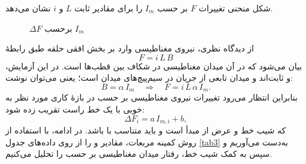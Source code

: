 \documentclass[a4paper, 11pt]{article}
\begin{document}
شکل منحنی تغییرات $F$ بر حسب $I_m$ را برای مقادیر ثابت $L$ و $i$ نشان می‌دهد.

\begin{figure}[h]
\caption{{$\Delta F$ برحسب $I_m$}}
\label{fig:ImF}
\centering
{}

\end{figure}

از دیدگاه نظری، نیروی مغناطیسی وارد بر بخش افقی حلقه طبق رابطهٔ
\begin{equation}
F = i\,L\,B
\end{equation}
بیان می‌شود که در آن  میدان مغناطیسی در شکاف بین قطب‌ها است. در این آزمایش،  و  ثابت‌اند و میدان  تابعی از جریان  در سیم‌پیچ‌های میدان است؛ یعنی می‌توان نوشت:
\begin{equation}
B = \alpha\,I_m \quad\Rightarrow\quad F = i\,L\,\alpha\,I_m.
\end{equation}
بنابراین انتظار می‌رود تغییرات نیروی مغناطیسی بر حسب  در بازهٔ کاری مورد نظر به خوبی با یک خط راست تقریب زده شود:
\begin{equation}
\Delta F_i = a\,I_{m,i} + b,
\end{equation}
که  شیب خط و  عرض از مبدأ است و  باید متناسب با  باشد. در ادامه، با استفاده از روش کمینه مربعات، مقادیر  و  را از روی داده‌های جدول \ref{tab3} به‌دست می‌آوریم و سپس به کمک شیب خط، رفتار میدان مغناطیسی بر حسب  را تحلیل می‌کنیم.
\end{document}
